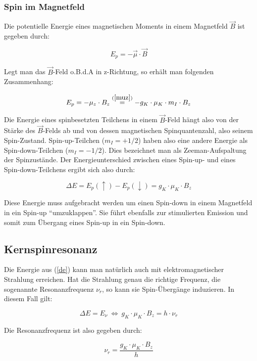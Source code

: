 \subsubsection{Spin im Magnetfeld}

Die potentielle Energie eines magnetischen Moments in einem Magnetfeld $\vec B$ ist gegeben durch:

$$ E_p = -\vec\mu\cdot\vec B $$

Legt man das $\vec B$-Feld o.B.d.A in z-Richtung, so erhält man folgenden Zusammenhang:

$$ E_p = -\mu_z\cdot B_z \stackrel{(\ref{muz})}{=} -g_K \cdot \mu_K \cdot m_I\cdot B_z $$

Die Energie eines spinbesetzten Teilchens in einem $\vec B$-Feld hängt also von der Stärke des $\vec B$-Felds ab und von dessen magnetischen Spinquantenzahl, also seinem Spin-Zustand. Spin-up-Teilchen ($m_I = +1/2$) haben also eine andere Energie als Spin-down-Teilchen ($m_I = -1/2$). Dies bezeichnet man als Zeeman-Aufspaltung der Spinzustände. Der Energieunterschied zwischen eines Spin-up- und eines Spin-down-Teilchens ergibt sich also durch:

\begin{equation} \Delta E = E_p(\uparrow) - E_p(\downarrow) =  g_K \cdot \mu_K \cdot B_z \label{de} \end{equation}

Diese Energie muss aufgebracht werden um einen Spin-down in einem Magnetfeld in ein Spin-up "`umzuklappen"'. Sie führt ebenfalls zur stimulierten Emission und somit zum Übergang eines Spin-up in ein Spin-down.

\subsection{Kernspinresonanz}

Die Energie aus (\ref{de}) kann man natürlich auch mit elektromagnetischer Strahlung erreichen. Hat die Strahlung genau die richtige Frequenz, die sogenannte Resonanzfrequenz $\nu_r$, so kann sie Spin-Übergänge induzieren. In diesem Fall gilt:

$$ \Delta E = E_\nu \ \Leftrightarrow \ g_K \cdot \mu_K \cdot B_z = h\cdot \nu_r $$

Die Resonanzfrequenz ist also gegeben durch:

\begin{equation} \nu_r = \frac{g_K \cdot \mu_K \cdot B_z}{h} \label{g} \end{equation}

